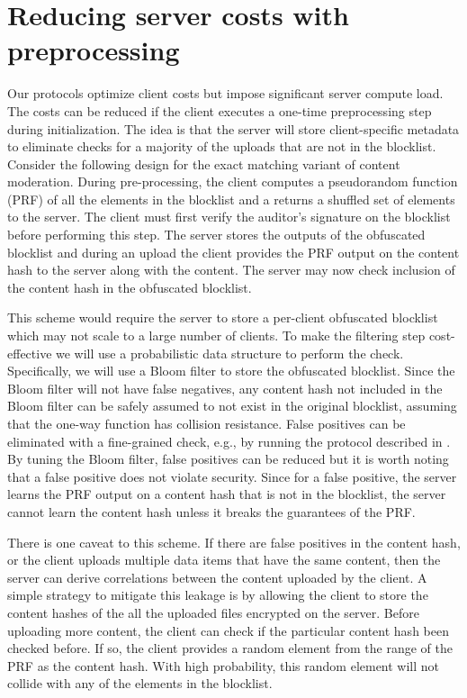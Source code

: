 \section{Reducing server costs with preprocessing}
\label{sec:reducing_server_cost}
%


\newcommand{\cuckooTablePerm}{\ensuremath{T'}\xspace}



Our protocols optimize client costs but impose significant server compute load. The costs can be reduced if the client executes a one-time preprocessing step during initialization. The idea is that the server will store client-specific metadata to eliminate checks for a majority of the uploads that are not in the blocklist. Consider the following design for the exact matching variant of content moderation. During pre-processing, the client computes a pseudorandom function (PRF) of all the elements in the blocklist and a returns a shuffled set of elements to the server. The client must first verify the auditor's signature on the blocklist before performing this step. The server stores the outputs of the obfuscated blocklist and during an upload the client provides the PRF output on the content hash to the server along with the content. The server may now check inclusion of the content hash in the obfuscated blocklist. 

This scheme would require the server to store a per-client obfuscated blocklist which may not scale to a large number of clients. To make the filtering step cost-effective we will use a probabilistic data structure to perform the check. Specifically, we will use a Bloom filter to store the obfuscated blocklist. Since the Bloom filter will not have false negatives, any content hash not included in the Bloom filter can be safely assumed to not exist in the original blocklist, assuming that the one-way function has collision resistance. False positives can be eliminated with a fine-grained check, e.g., by running the protocol described in \figref{}. By tuning the Bloom filter, false positives can be reduced but it is worth noting that a false positive does not violate security. Since for a false positive, the server learns the PRF output on a content hash that is not in the blocklist, the server cannot learn the content hash unless it breaks the guarantees of the PRF. 

There is one caveat to this scheme. If there are false positives in the content hash, or the client uploads multiple data items that have the same content, then the server can derive correlations between the content uploaded by the client. A simple strategy to mitigate this leakage is by allowing the client to store the content hashes of the all the uploaded files encrypted on the server. Before uploading more content, the client can check if the particular content hash been checked before. If so, the client provides a random element from the range of the PRF as the content hash. With high probability, this random element will not collide with any of the elements in the blocklist. 



